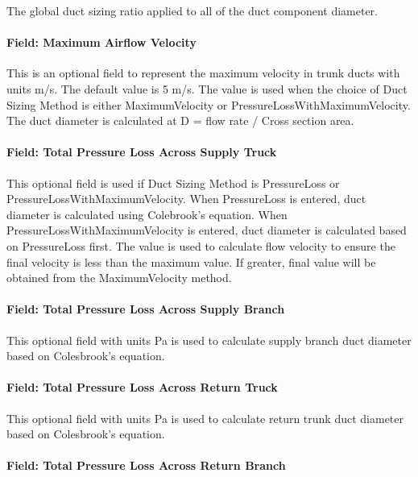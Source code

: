 The global duct sizing ratio applied to all of the duct component diameter.

\paragraph{Field: Maximum Airflow Velocity}\label{maximum-airflow-velocity}

This is an optional field to represent the maximum velocity in trunk ducts with units m/s. The default value is 5 m/s. The value is used when the choice of Duct Sizing Method is either MaximumVelocity or PressureLossWithMaximumVelocity. The duct diameter is calculated at D = flow rate / Cross section area.

\paragraph{Field: Total Pressure Loss Across Supply Truck}\label{total-pressure-loss-across-supply-truck}

This optional field is used if Duct Sizing Method is PressureLoss or PressureLossWithMaximumVelocity. When PressureLoss is entered, duct diameter is calculated using Colebrook's equation.  When PressureLossWithMaximumVelocity is entered, duct diameter is calculated based on PressureLoss first. The value is used to calculate flow velocity to ensure the final velocity is less than the maximum value. If greater, final value will be obtained from the MaximumVelocity method.

\paragraph{Field: Total Pressure Loss Across Supply Branch}\label{total-pressure-loss-across-supply-branch}

This optional field with units Pa is used to calculate supply branch duct diameter based on Colesbrook's equation. 

\paragraph{Field: Total Pressure Loss Across Return Truck}\label{total-pressure-loss-across-return-truck}

This optional field with units Pa is used to calculate return trunk duct diameter based on Colesbrook's equation. 

\paragraph{Field: Total Pressure Loss Across Return Branch}\label{total-pressure-loss-across-return-branch}
 
